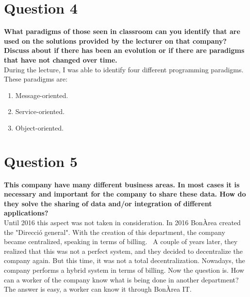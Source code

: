 \documentclass[12pt]{article}
\begin{document}
\section*{Question 4}
\textbf{What paradigms of those seen in classroom can you identify that are used on the solutions provided by the lecturer on that company? Discuss about if there has been an evolution or if there are paradigms that have not changed over time.}\\
During the lecture, I was able to identify four different programming paradigms. These paradigms are:
\begin{enumerate}
    \item Message-oriented.
    \item Service-oriented.
    \item Object-oriented.
\end{enumerate}
\section*{Question 5}
\textbf{This company have many different business areas. In most cases it is necessary and important for the company to share these data. How do they solve the sharing of data and/or integration of different applications?}\\
Until 2016 this aspect was not taken in consideration. In 2016 BonÀrea created the "Direcció general". With the creation of this department, the company became centralized, speaking in terms of billing.  A couple of years later, they realized that this was not a perfect system, and they decided to decentralize the company again. But this time, it was not a total decentralization. Nowadays, the company performs a hybrid system in terms of billing.
Now the question is. How can a worker of the company know what is being done in  another department? The answer is easy, a worker can know it through BonÀrea IT.
\end{document}
